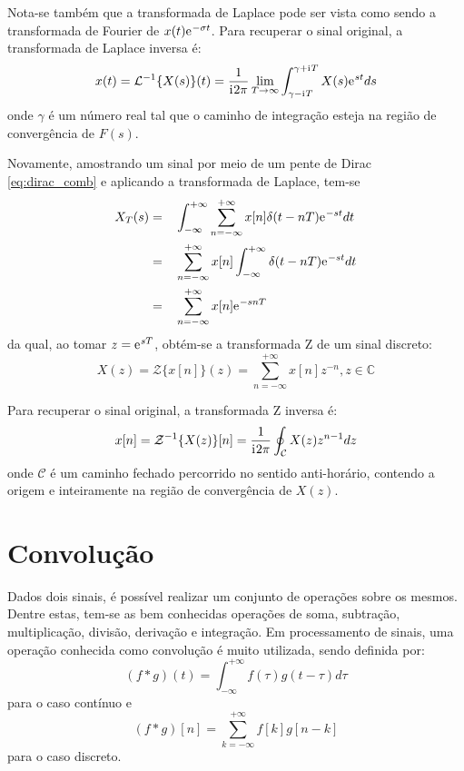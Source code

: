 \documentclass[12pt,a4paper]{report}
\newcommand{\I}{{\mathrm{i}\mkern1mu}}
\newcommand{\euler}{{\mathrm{e}\mkern1mu}}
\begin{document}
  Nota-se também que a transformada de Laplace pode ser vista como sendo a transformada de Fourier de
  $x(t) \euler^{-\sigma t}$. Para recuperar o sinal original, a transformada de Laplace inversa é:
  \begin{equation}
    x(t) = \mathcal{L}^{-1}\{X(s)\}(t) = \frac{1}{\I 2 \pi} \lim_{T \rightarrow \infty}
    \int_{\gamma - \I T}^{\gamma + \I T} X(s) \euler^{s t} ds
  \end{equation}
  onde $\gamma$ é um número real tal que o caminho de integração esteja na região de convergência de $F(s)$.

  Novamente, amostrando um sinal por meio de um pente de Dirac \eqref{eq:dirac_comb} e aplicando
  a transformada de Laplace, tem-se
  \begin{equation}
    \begin{split}
      X_T(s) = &\quad \int_{-\infty}^{+\infty} \sum_{n = -\infty}^{+\infty} x[n] \delta(t - n T) \euler^{-s t} dt
      \\= &\quad \sum_{n = -\infty}^{+\infty} x[n] \int_{-\infty}^{+\infty} \delta(t - n T) \euler^{-s t} dt
      \\= &\quad \sum_{n = -\infty}^{+\infty} x[n] \euler^{-s n T}
    \end{split}
  \end{equation}
  da qual, ao tomar $z = \euler^{s T}$, obtém-se a transformada Z de um sinal discreto:
  \begin{equation}
    X(z) = \mathcal{Z}\{x[n]\}(z) = \sum_{n = -\infty}^{+\infty} x[n] z^{-n}, z \in \mathbb{C}
  \end{equation}

  Para recuperar o sinal original, a transformada Z inversa é:
  \begin{equation}
    x[n] = \mathcal{Z}^{-1}\{X(z)\}[n] = \frac{1}{\I 2 \pi} \oint_{\mathcal{C}} X(z) z^{n - 1} dz
  \end{equation}
  onde $\mathcal{C}$ é um caminho fechado percorrido no sentido anti-horário, contendo a origem e inteiramente
  na região de convergência de $X(z)$.

\section{Convolução}
  Dados dois sinais, é possível realizar um conjunto de operações sobre os mesmos. Dentre estas, tem-se as bem
  conhecidas operações de soma, subtração, multiplicação, divisão, derivação e integração. Em processamento
  de sinais, uma operação conhecida como convolução é muito utilizada, sendo definida por:
  \begin{equation}
    (f \ast g)(t) = \int_{-\infty}^{+\infty} f(\tau) g(t - \tau) d\tau
  \end{equation}
  para o caso contínuo e
  \begin{equation}
    (f \ast g)[n] = \sum_{k = -\infty}^{+\infty} f[k] g[n - k]
  \end{equation}
  para o caso discreto.
\end{document}
